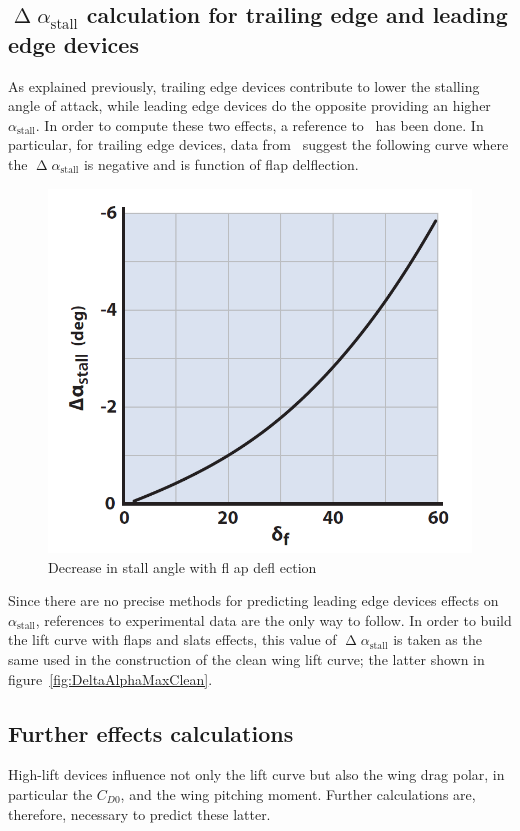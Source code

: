 \subsection{$\upDelta\alpha_{\text{stall}}$ calculation for trailing edge and leading edge devices}
As explained previously, trailing edge devices contribute to lower the stalling angle of attack, while leading edge devices do the opposite providing an higher $\alpha_{\text{stall}}$. 
%
In order to compute these two effects, a reference to~\cite{nicolai2010fundamentals} has been done. In particular, for trailing edge devices, data from~\cite{abbott} suggest the following curve where the $\upDelta\alpha_{\text{stall}}$ is negative and is function of flap delflection.
%
\begin{figure}[H]
\centering
\includegraphics[width=0.6\linewidth]{DeltaAlphaMax}
\caption{Decrease in stall angle with fl ap defl ection}
\label{fig:DeltaAlphaMaxFlap}
\end{figure}
%
\noindent
Since there are no precise methods for predicting leading edge devices effects on $\alpha_{\text{stall}}$, references to experimental data are the only way to follow. 
%
In order to build the lift curve with flaps and slats effects, this value of $\upDelta\alpha_{\text{stall}}$ is taken as the same used in the construction of the clean wing lift curve; the latter shown in figure~\ref{fig:DeltaAlphaMaxClean}.
%
\subsection{Further effects calculations}\label{subpar:DCD0}
High-lift devices influence not only the lift curve but also the wing drag polar, in particular the $C_{D0}$, and the wing pitching moment. Further calculations are, therefore, necessary to predict these latter.

